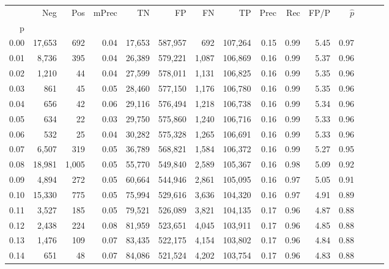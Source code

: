 \begin{tabular}{rrrrrrrrrrrrrrr}
\toprule
{} &     Neg &    Pos & mPrec &       TN &       FP &       FN &       TP &  Prec &   Rec &  FP/P & $\hat{p}$ \\
p    &         &        &       &          &          &          &          &       &       &       &           \\
\midrule
0.00 &  17,653 &    692 &  0.04 &   17,653 &  587,957 &      692 &  107,264 &  0.15 &  0.99 &  5.45 &      0.97 \\
0.01 &   8,736 &    395 &  0.04 &   26,389 &  579,221 &    1,087 &  106,869 &  0.16 &  0.99 &  5.37 &      0.96 \\
0.02 &   1,210 &     44 &  0.04 &   27,599 &  578,011 &    1,131 &  106,825 &  0.16 &  0.99 &  5.35 &      0.96 \\
0.03 &     861 &     45 &  0.05 &   28,460 &  577,150 &    1,176 &  106,780 &  0.16 &  0.99 &  5.35 &      0.96 \\
0.04 &     656 &     42 &  0.06 &   29,116 &  576,494 &    1,218 &  106,738 &  0.16 &  0.99 &  5.34 &      0.96 \\
0.05 &     634 &     22 &  0.03 &   29,750 &  575,860 &    1,240 &  106,716 &  0.16 &  0.99 &  5.33 &      0.96 \\
0.06 &     532 &     25 &  0.04 &   30,282 &  575,328 &    1,265 &  106,691 &  0.16 &  0.99 &  5.33 &      0.96 \\
0.07 &   6,507 &    319 &  0.05 &   36,789 &  568,821 &    1,584 &  106,372 &  0.16 &  0.99 &  5.27 &      0.95 \\
0.08 &  18,981 &  1,005 &  0.05 &   55,770 &  549,840 &    2,589 &  105,367 &  0.16 &  0.98 &  5.09 &      0.92 \\
0.09 &   4,894 &    272 &  0.05 &   60,664 &  544,946 &    2,861 &  105,095 &  0.16 &  0.97 &  5.05 &      0.91 \\
0.10 &  15,330 &    775 &  0.05 &   75,994 &  529,616 &    3,636 &  104,320 &  0.16 &  0.97 &  4.91 &      0.89 \\
0.11 &   3,527 &    185 &  0.05 &   79,521 &  526,089 &    3,821 &  104,135 &  0.17 &  0.96 &  4.87 &      0.88 \\
0.12 &   2,438 &    224 &  0.08 &   81,959 &  523,651 &    4,045 &  103,911 &  0.17 &  0.96 &  4.85 &      0.88 \\
0.13 &   1,476 &    109 &  0.07 &   83,435 &  522,175 &    4,154 &  103,802 &  0.17 &  0.96 &  4.84 &      0.88 \\
0.14 &     651 &     48 &  0.07 &   84,086 &  521,524 &    4,202 &  103,754 &  0.17 &  0.96 &  4.83 &      0.88 \\

\end{tabular}

